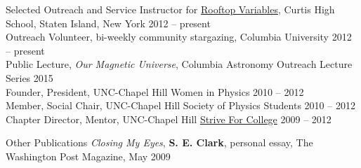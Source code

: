 \documentclass{resume_clark} %
\begin{document}

\begin{rSection}{Selected Outreach and Service}
Instructor for \href{http://rv.astro.columbia.edu/}{Rooftop Variables}, Curtis High School, Staten Island, New York \hfill{2012 -- present}\\
Outreach Volunteer, bi-weekly community stargazing, Columbia University \hfill{2012 -- present}\\
Public Lecture, \textit{Our Magnetic Universe}, Columbia Astronomy Outreach Lecture Series \hfill{2015} \\ 
Founder, President, UNC-Chapel Hill Women in Physics \hfill{2010 -- 2012}\\
Member, Social Chair, UNC-Chapel Hill Society of Physics Students \hfill{2010 -- 2012}\\
Chapter Director, Mentor, UNC-Chapel Hill \href{http://striveforcollege.org/}{Strive For College} \hfill{2009 -- 2012}\\

\end{rSection}



\begin{rSection}{Other Publications}
{\textit{Closing My Eyes}}, \textbf{S. E. Clark}, personal essay, The Washington Post Magazine, May 2009
\end{rSection}








\end{document}
